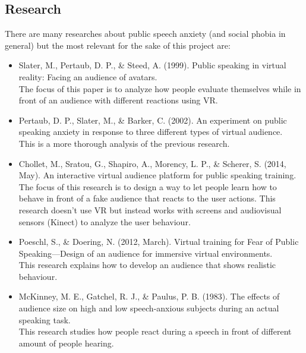 \subsection{Research}
There are many researches about public speech anxiety (and social phobia in general) but the most relevant for the sake of this project are:

\begin{itemize}
	\item Slater, M., Pertaub, D. P., \& Steed, A. (1999). Public speaking in virtual reality: Facing an audience of avatars.\cite{VRPublicSpeaking}\\[0.15cm]
	The focus of this paper is to analyze how people evaluate themselves while in front of an audience with different reactions using VR.
	
	\item Pertaub, D. P., Slater, M., \& Barker, C. (2002). An experiment on public speaking anxiety in response to three different types of virtual audience.\cite{VRPublicSpeaking2}\\[0.15cm]
	This is a more thorough analysis of the previous research.
	
	\item Chollet, M., Sratou, G., Shapiro, A., Morency, L. P., \& Scherer, S. (2014, May). An interactive virtual audience platform for public speaking training.\cite{VRPublicSpeaking3} \\[0.15cm]
	The focus of this research is to design a way to let people learn how to behave in front of a fake audience that reacts to the user actions. This research doesn't use VR but instead works with screens and audiovisual sensors (Kinect) to analyze the user behaviour.
	
	\item Poeschl, S., \& Doering, N. (2012, March). Virtual training for Fear of Public Speaking—Design of an audience for immersive virtual environments.\cite{VRPublicSpeaking4}\\[0.15cm]
	This research explains how to develop an audience that shows realistic behaviour.
	
	\item McKinney, M. E., Gatchel, R. J., \& Paulus, P. B. (1983). The effects of audience size on high and low speech-anxious subjects during an actual speaking task.\cite{VRPublicSpeaking5}\\[0.15cm]
	This research studies how people react during a speech in front of different amount of people hearing.
\end{itemize}